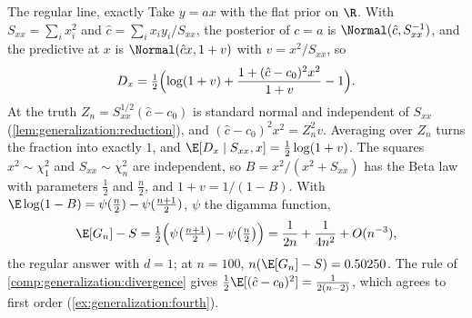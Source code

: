 \begin{refsection}
\begin{computation}{The regular line, exactly}\label{comp:generalization:line}
\step Take $y=ax$ with the flat prior on $\R$. With $S_{xx}=\sum_ix_i^2$ and $\hat c=\sum_ix_iy_i/S_{xx}$, the posterior of $c=a$ is $\Normal(\hat c,S_{xx}^{-1})$, and the predictive at $x$ is $\Normal(\hat cx,1+v)$ with $v=x^2/S_{xx}$, so
\[
D_x=\tfrac12\Bigl(\log(1+v)+\frac{1+(\hat c-c_0)^2x^2}{1+v}-1\Bigr).
\]
\step At the truth $Z_n=S_{xx}^{1/2}(\hat c-c_0)$ is standard normal and independent of $S_{xx}$ (\cref{lem:generalization:reduction}), and $(\hat c-c_0)^2x^2=Z_n^2v$. Averaging over $Z_n$ turns the fraction into exactly $1$, and $\E[D_x\mid S_{xx},x]=\frac12\log(1+v)$.
\step The squares $x^2\sim\chi^2_1$ and $S_{xx}\sim\chi^2_n$ are independent, so $B=x^2/(x^2+S_{xx})$ has the Beta law with parameters $\frac12$ and $\frac n2$, and $1+v=1/(1-B)$. With $\E\log(1-B)=\psi(\frac n2)-\psi(\frac{n+1}2)$, $\psi$ the digamma function,
\[
\E[G_n]-S=\tfrac12\Bigl(\psi\bigl(\tfrac{n+1}2\bigr)-\psi\bigl(\tfrac n2\bigr)\Bigr)=\frac1{2n}+\frac1{4n^2}+O(n^{-3}),
\]
the regular answer with $d=1$; at $n=100$, $n(\E[G_n]-S)=0.50250$. The rule of \cref{comp:generalization:divergence} gives $\frac12\E[(\hat c-c_0)^2]=\frac1{2(n-2)}$, which agrees to first order (\cref{ex:generalization:fourth}).
\end{computation}


\end{refsection}
